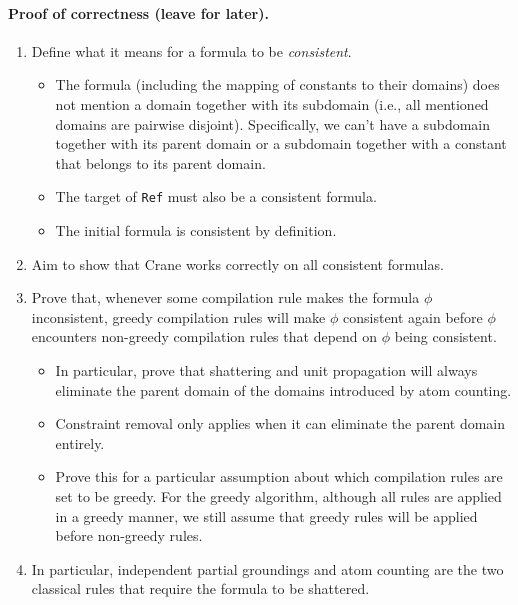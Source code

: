 \documentclass{article}
\begin{document}
\paragraph{Proof of correctness (leave for later).}
\begin{enumerate}
  \item Define what it means for a formula to be \emph{consistent}.
        \begin{itemize}
          \item The formula (including the mapping of constants to their
                domains) does not mention a domain together with its subdomain
                (i.e., all mentioned domains are pairwise disjoint).
                Specifically, we can't have a subdomain together with its parent
                domain or a subdomain together with a constant that belongs to
                its parent domain.
          \item The target of \texttt{Ref} must also be a consistent formula.
          \item The initial formula is consistent by definition.
        \end{itemize}
  \item Aim to show that Crane works correctly on all consistent formulas.
  \item Prove that, whenever some compilation rule makes the formula $\phi$
        inconsistent, greedy compilation rules will make $\phi$ consistent again
        before $\phi$ encounters non-greedy compilation rules that depend on
        $\phi$ being consistent.
        \begin{itemize}
          \item In particular, prove that shattering and unit propagation will
                always eliminate the parent domain of the domains introduced by
                atom counting.
          \item Constraint removal only applies when it can eliminate the parent
                domain entirely.
          \item Prove this for a particular assumption about which compilation
                rules are set to be greedy. For the greedy algorithm, although
                all rules are applied in a greedy manner, we still assume that
                greedy rules will be applied before non-greedy rules.
        \end{itemize}
  \item In particular, independent partial groundings and atom counting are the
        two classical rules that require the formula to be shattered.
  \end{enumerate}
\end{document}
